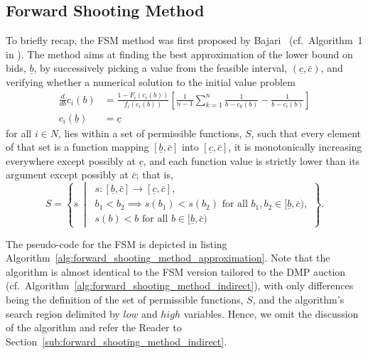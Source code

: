 \subsection{Forward Shooting Method} %
\label{sub:forward_shooting_method}
To briefly recap, the FSM method was first proposed by Bajari~\cite{Bajari2001a} (cf.~Algorithm~1 in \cite{Bajari2001a}). The method aims at finding the best approximation of the lower bound on bids, $\underline{b}$, by successively picking a value from the feasible interval, $(\underline{c}, \bar{c})$, and verifying whether a numerical solution to the initial value problem
\begin{equation}
  \label{eq:fsm_initial_value_problem_approximation}
  \begin{array}{ll}
     \displaystyle\frac{d}{db}c_i(b) &= \displaystyle\frac{1 - F_i(c_i(b))}{f_i(c_i(b))}\left[ \frac{1}{n-1}\sum_{k=1}^n \frac{1}{b-c_k(b)} - \frac{1}{b-c_i(b)} \right]\\[2ex]
    c_i(\underline{b}) &= \underline{c}
  \end{array}
\end{equation}
for all $i\in N$, lies within a set of permissible functions, $S$, such that every element of that set is a function mapping $[\underline{b}, \bar{c}]$ into $[\underline{c}, \bar{c}]$, it is monotonically increasing everywhere except possibly at $\underline{c}$, and each function value is strictly lower than its argument except possibly at $\bar{c}$; that is,
\begin{equation*}
  S=\left\{s \:\middle\vert\:
  \begin{array}{l}
    s: [\underline{b}, \bar{c}]\to [\underline{c}, \bar{c}],\\
    b_1 < b_2\implies s(b_1) < s(b_2) \text{ for all }b_1,b_2\in [\underline{b}, \bar{c}),\\
    s(b) < b \text{ for all }b\in [\underline{b}, \bar{c})
  \end{array}
  \right\}.
\end{equation*}

The pseudo-code for the FSM is depicted in listing Algorithm~\ref{alg:forward_shooting_method_approximation}. Note that the algorithm is almost identical to the FSM version tailored to the DMP auction (cf.~Algorithm~\ref{alg:forward_shooting_method_indirect}), with only differences being the definition of the set of permissible functions, $S$, and the algorithm's search region delimited by $low$ and $high$ variables. Hence, we omit the discussion of the algorithm and refer the Reader to Section~\ref{sub:forward_shooting_method_indirect}.

